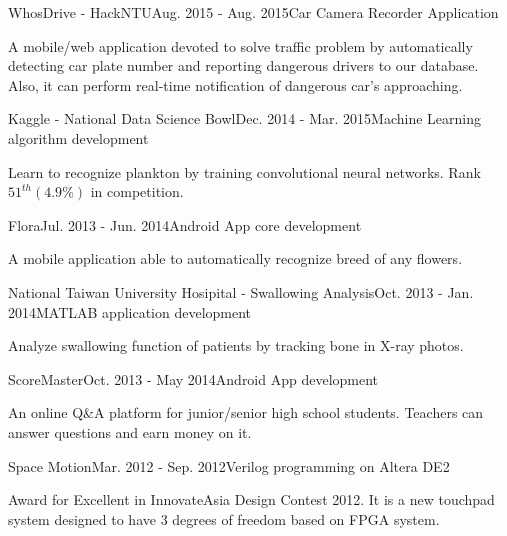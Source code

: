 \documentclass{joel_cv}
\begin{document}


%
%


\begin{sectionContentNormal}{WhosDrive - HackNTU}{Aug. 2015 - Aug. 2015}{Car Camera Recorder Application}
	\item A mobile/web application devoted to solve traffic problem by automatically detecting car plate number and reporting dangerous drivers to our database. Also, it can perform real-time notification of dangerous car's approaching.
\end{sectionContentNormal}

\begin{sectionContentNormal}{Kaggle - National Data Science Bowl}{Dec. 2014 - Mar. 2015}{Machine Learning algorithm development}
	\item Learn to recognize plankton by training convolutional neural networks. Rank $51^{th} (4.9\%)$ in competition.
\end{sectionContentNormal}

\begin{sectionContentNormal}{Flora}{Jul. 2013 - Jun. 2014}{Android App core development}
	\item A mobile application able to automatically recognize breed of any flowers.
\end{sectionContentNormal}

\begin{sectionContentNormal}{National Taiwan University Hosipital - Swallowing Analysis}{Oct. 2013 - Jan. 2014}{MATLAB application development}
	\item Analyze swallowing function of patients by tracking bone in X-ray photos.
\end{sectionContentNormal}

\begin{sectionContentNormal}{ScoreMaster}{Oct. 2013 - May 2014}{Android App development}
	\item An online Q\&A platform for junior/senior high school students. Teachers can answer questions and earn money on it.
\end{sectionContentNormal}

\begin{sectionContentNormal}{Space Motion}{Mar. 2012 - Sep. 2012}{Verilog programming on Altera DE2}
	\item Award for Excellent in InnovateAsia Design Contest 2012. It is a new touchpad system designed to have 3 degrees of freedom based on FPGA system.
\end{sectionContentNormal}
\end{document}

